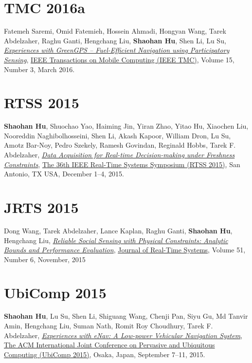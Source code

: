 \section{\sc TMC 2016a}\hypertarget{saremi2016tmc}{}
Fatemeh Saremi, Omid Fatemieh, Hossein Ahmadi, Hongyan Wang, Tarek Abdelzaher, Raghu Ganti, Hengchang Liu, \textbf{Shaohan Hu}, Shen Li, Lu Su,
\href{http://ieeexplore.ieee.org/document/7084108}{\emph{Experiences with GreenGPS -- Fuel-Efficient Navigation using Participatory Sensing}},
\href{http://www.computer.org/web/tmc}{\textsf{IEEE Transactions on Mobile Computing (IEEE TMC)}},
Volume 15, Number 3, March 2016.

\section{\sc RTSS 2015}\hypertarget{hu2015rtss}{}
\textbf{Shaohan Hu}, Shuochao Yao, Haiming Jin, Yiran Zhao, Yitao Hu, Xiaochen Liu, Nooreddin Naghibolhosseini, Shen Li, Akash Kapoor, William Dron, Lu Su, Amotz Bar-Noy, Pedro Szekely, Ramesh Govindan, Reginald Hobbs, Tarek F. Abdelzaher,
\href{http://ieeexplore.ieee.org/document/7383576}{\emph{Data Acquisition for Real-time Decision-making under Freshness Constraints}},
\href{http://2015.rtss.org/}{\textsf{The 36th IEEE Real-Time Systems Symposium (RTSS 2015)}},
San Antonio, TX USA, December 1--4, 2015.

\section{\sc JRTS 2015}\hypertarget{wang2015jrts}{}
Dong Wang, Tarek Abdelzaher, Lance Kaplan, Raghu Ganti, \textbf{Shaohan Hu}, Hengchang Liu,
\href{http://link.springer.com/article/10.1007%2Fs11241-015-9238-8}{\emph{Reliable Social Sensing with Physical Constraints: Analytic Bounds and Performance Evaluation}},
\href{http://link.springer.com/journal/11241}{\textsf{Journal of Real-Time Systems}},
Volume 51, Number 6, November, 2015

\section{\sc UbiComp 2015}\hypertarget{hu2015ubicomp}{}
\textbf{Shaohan Hu}, Lu Su, Shen Li, Shiguang Wang, Chenji Pan, Siyu Gu, Md Tanvir Amin, Hengchang Liu, Suman Nath, Romit Roy Choudhury, Tarek F. Abdelzaher,
\href{http://dl.acm.org/citation.cfm?id=2804287}{\emph{Experiences with eNav: A Low-power Vehicular Navigation System}},
\href{http://ubicomp.org/ubicomp2015/}{\textsf{The ACM International Joint Conference on Pervasive and Ubiquitous Computing (UbiComp 2015)}},
Osaka, Japan, September 7--11, 2015.

